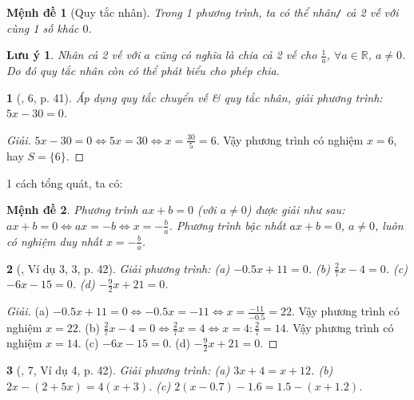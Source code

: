 \documentclass{article}
\newtheorem{baitoan}{}
\newtheorem{luuy}{Lưu ý}
\newtheorem{menhde}{Mệnh đề}
\begin{document}
\begin{menhde}[Quy tắc nhân]
	Trong 1 phương trình, ta có thể nhân\emph{\texttt{/}} cả 2 vế với cùng 1 số khác $0$.
\end{menhde}

\begin{luuy}
	Nhân cả 2 vế với $a$ cũng có nghĩa là chia cả 2 vế cho $\frac{1}{a}$, $\forall a\in\mathbb{R}$, $a\ne0$. Do đó quy tắc nhân còn có thể phát biểu cho phép chia.
\end{luuy}

\begin{baitoan}[\cite{SGK_Toan_8_Canh_Dieu_tap_2}, 6, p. 41]
	Áp dụng quy tắc chuyển vế \& quy tắc nhân, giải phương trình: $5x - 30 = 0$.
\end{baitoan}

\begin{proof}[Giải]
	$5x - 30 = 0\Leftrightarrow5x = 30\Leftrightarrow x = \frac{30}{5} = 6$. Vậy phương trình có nghiệm $x = 6$, hay $S = \{6\}$.
\end{proof}
1 cách tổng quát, ta có:

\begin{menhde}
	 Phương trình $ax + b = 0$ (với $a\ne0$) được giải như sau: $ax + b = 0\Leftrightarrow ax = -b\Leftrightarrow x = -\frac{b}{a}$. Phương trình bậc nhất $ax + b = 0$, $a\ne0$, luôn có nghiệm duy nhất $x = -\frac{b}{a}$.
\end{menhde}

\begin{baitoan}[\cite{SGK_Toan_8_Canh_Dieu_tap_2}, Ví dụ 3, 3, p. 42]
	Giải phương trình: (a) $-0.5x + 11 = 0$. (b) $\frac{2}{7}x - 4 = 0$. (c) $-6x - 15 = 0$. (d) $-\frac{9}{2}x + 21 = 0$.
\end{baitoan}

\begin{proof}[Giải]
	(a) $-0.5x + 11 = 0\Leftrightarrow-0.5x = -11\Leftrightarrow x = \frac{-11}{-0.5} = 22$. Vậy phương trình có nghiệm $x = 22$. (b) $\frac{2}{7}x - 4 = 0\Leftrightarrow\frac{2}{7}x = 4\Leftrightarrow x = 4:\frac{2}{7} = 14$. Vậy phương trình có nghiệm $x = 14$. (c) $-6x - 15 = 0$. (d) $-\frac{9}{2}x + 21 = 0$.
\end{proof}

\begin{baitoan}[\cite{SGK_Toan_8_Canh_Dieu_tap_2}, 7, Ví dụ 4, p. 42]
	Giải phương trình: (a) $3x + 4 = x + 12$. (b) $2x - (2 + 5x) = 4(x + 3)$. (c) $2(x - 0.7) - 1.6 = 1.5 - (x + 1.2)$.
\end{baitoan}
\end{document}
